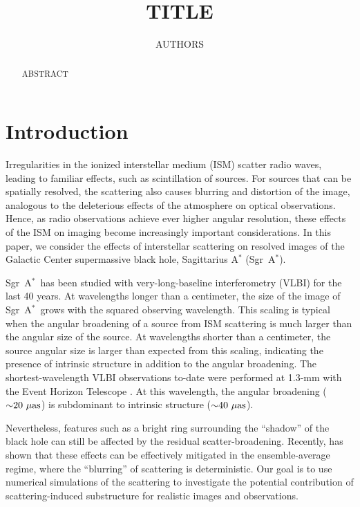 \documentclass[11pt,preprint]{aastex}
\newcommand{\sgra}{Sgr~A$^{\ast}$}
\begin{document}
\title{TITLE}

\author{AUTHORS}

\begin{abstract}

ABSTRACT

\end{abstract}


\section{Introduction} \label{intro}

Irregularities in the ionized interstellar medium (ISM) scatter radio waves, 
leading to familiar effects, such as scintillation of sources.  For 
sources that can be spatially resolved, the scattering also causes blurring and
distortion of the image, analogous to the deleterious effects of the atmosphere 
on optical observations.  Hence, as radio observations achieve ever higher 
angular resolution, these effects of the ISM on imaging become increasingly 
important considerations.  In this paper, we consider the effects of 
interstellar scattering on resolved images of the Galactic Center supermassive 
black hole, Sagittarius A$^\ast$ (\sgra).

\sgra\ has been studied with very-long-baseline interferometry (VLBI) for the 
last 40 years.  At wavelengths longer than a centimeter, the size of the image 
of \sgra\ grows with the squared observing wavelength.  This scaling is typical 
when the angular broadening of a source from ISM scattering is much larger than 
the angular size of the source.  At wavelengths shorter than a centimeter, the 
source angular size is larger than expected from this scaling, indicating the 
presence of intrinsic structure in addition to the angular broadening.  The 
shortest-wavelength VLBI observations to-date were performed at 1.3-mm with the 
Event Horizon Telescope \citep{doeleman08,fish11}.  At this wavelength, 
the angular broadening (${\sim}20~\mu{\rm as}$) is subdominant to intrinsic 
structure (${\sim}40~\mu{\rm as}$). 

Nevertheless, features such as a bright ring surrounding the ``shadow'' of the 
black hole can still be affected by the residual scatter-broadening.   Recently,
\citet{fish14} has shown that these effects can be effectively mitigated in 
the ensemble-average regime, where the ``blurring'' of scattering is 
deterministic.  Our goal is to use numerical simulations of the scattering to 
investigate the potential contribution of scattering-induced substructure for 
realistic images and observations.
\end{document}
